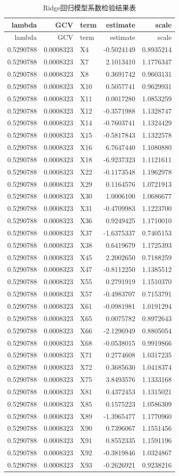 \documentclass[
]{article}
\begin{document}
\begin{longtable}[]{@{}rrlrr@{}}
\caption{Ridge回归模型系数检验结果表}\tabularnewline
\toprule
lambda & GCV & term & estimate & scale\tabularnewline
\midrule
\endfirsthead
\toprule
lambda & GCV & term & estimate & scale\tabularnewline
\midrule
\endhead
0.5290788 & 0.0008323 & X4 & -0.5024149 & 0.8935214\tabularnewline
0.5290788 & 0.0008323 & X7 & 2.1013410 & 1.1776347\tabularnewline
0.5290788 & 0.0008323 & X8 & 0.3691742 & 0.9603131\tabularnewline
0.5290788 & 0.0008323 & X10 & 0.5057741 & 0.9629931\tabularnewline
0.5290788 & 0.0008323 & X11 & 0.0017280 & 1.0853259\tabularnewline
0.5290788 & 0.0008323 & X12 & -0.3571988 & 1.1328747\tabularnewline
0.5290788 & 0.0008323 & X14 & -0.7603741 & 1.1324429\tabularnewline
0.5290788 & 0.0008323 & X15 & -0.5817843 & 1.1322578\tabularnewline
0.5290788 & 0.0008323 & X16 & 6.7647440 & 1.1080880\tabularnewline
0.5290788 & 0.0008323 & X18 & -6.9237323 & 1.1121611\tabularnewline
0.5290788 & 0.0008323 & X22 & -0.1173548 & 1.1962978\tabularnewline
0.5290788 & 0.0008323 & X29 & 0.1164576 & 1.0721913\tabularnewline
0.5290788 & 0.0008323 & X30 & 1.0006100 & 1.0686677\tabularnewline
0.5290788 & 0.0008323 & X31 & -0.4709983 & 1.1223700\tabularnewline
0.5290788 & 0.0008323 & X36 & 0.9249425 & 1.1710010\tabularnewline
0.5290788 & 0.0008323 & X37 & -1.6375337 & 0.7405153\tabularnewline
0.5290788 & 0.0008323 & X38 & 0.6419679 & 1.1725393\tabularnewline
0.5290788 & 0.0008323 & X45 & 2.2002650 & 0.7188259\tabularnewline
0.5290788 & 0.0008323 & X47 & -0.8112250 & 1.1385512\tabularnewline
0.5290788 & 0.0008323 & X55 & 0.2791919 & 1.1510370\tabularnewline
0.5290788 & 0.0008323 & X57 & -0.4983707 & 0.7153791\tabularnewline
0.5290788 & 0.0008323 & X61 & -0.0981981 & 1.0191294\tabularnewline
0.5290788 & 0.0008323 & X65 & 0.0075782 & 0.8972643\tabularnewline
0.5290788 & 0.0008323 & X66 & -2.1296949 & 0.8805054\tabularnewline
0.5290788 & 0.0008323 & X68 & -0.0538015 & 0.9919866\tabularnewline
0.5290788 & 0.0008323 & X71 & 0.2774608 & 1.0317235\tabularnewline
0.5290788 & 0.0008323 & X72 & 0.3685630 & 1.0418374\tabularnewline
0.5290788 & 0.0008323 & X75 & 3.8493576 & 1.1333168\tabularnewline
0.5290788 & 0.0008323 & X81 & 0.4372453 & 1.1315021\tabularnewline
0.5290788 & 0.0008323 & X85 & 0.1575223 & 1.0586309\tabularnewline
0.5290788 & 0.0008323 & X89 & -1.3965477 & 1.1770960\tabularnewline
0.5290788 & 0.0008323 & X90 & 0.7396067 & 1.1551456\tabularnewline
0.5290788 & 0.0008323 & X91 & 0.8552335 & 1.1591196\tabularnewline
0.5290788 & 0.0008323 & X92 & -0.3819846 & 1.0324867\tabularnewline
0.5290788 & 0.0008323 & X93 & -0.2626921 & 0.9238216\tabularnewline

\end{longtable}
\end{document}
